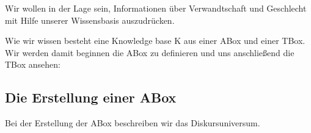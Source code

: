 \documentclass[runningheads,a4paper]{llncs}
\begin{document}
\vspace{0.5 cm}


\vspace{1 cm}

\hspace{1 cm}

\vspace{1 cm}

Wir wollen in der Lage sein, Informationen über Verwandtschaft und Geschlecht mit Hilfe unserer Wissensbasis auszudrücken.

Wie wir wissen besteht eine Knowledge base K aus einer ABox und einer TBox. Wir werden damit beginnen die ABox zu definieren und uns anschließend die TBox ansehen:

\subsection{Die Erstellung einer ABox}

Bei der Erstellung der ABox beschreiben wir das Diskursuniversum.
\end{document}
